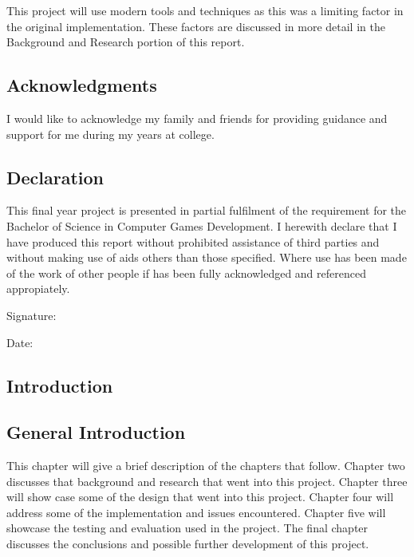 \documentclass[12pt]{article}
\begin{document}
This project will use modern tools and techniques as this was a limiting factor in the original implementation. These factors are discussed in more detail in the Background and Research portion of this report. 

\newpage
\begin{center}
\section*{Acknowledgments}
\end{center}
I would like to acknowledge my family and friends for providing guidance and support for me during my years at college. 
\newpage
\begin{center}
\section*{Declaration}
\end{center}
This final year project is presented in partial fulfilment of the requirement for the Bachelor of Science in Computer Games Development. I herewith declare that I have produced this report without prohibited assistance of third parties and without making use of aids others than those specified. Where use has been made of the work of other people if has been fully acknowledged and referenced appropiately. 

Signature: \underline{\hspace{3cm}}

Date: \underline{\hspace{3.855cm}}
\newpage

\begin{center}
\tableofcontents
\end{center}

\newpage
{}



\begin{center}
\section{Introduction}
\end{center}


{\centering \subsection{General Introduction}}
This chapter will give a brief description of the chapters that follow. Chapter two  discusses that background and research that went into this project. Chapter three will show case some of the design that went into this project. Chapter four will address some of the implementation and issues encountered. Chapter five will showcase the testing and evaluation used in the project. The final chapter discusses the conclusions and possible further development of this project.
\end{document}
